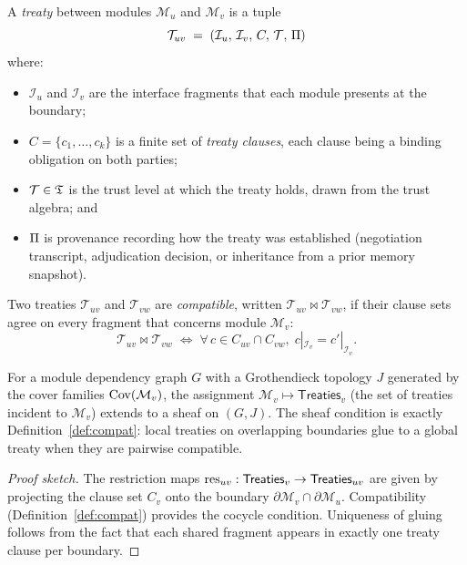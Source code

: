 \documentclass[11pt]{article}
\newcommand{\Trt}{\mathcal{T}}             %
\newcommand{\TrtSet}{\mathsf{Treaties}}    %
\newcommand{\Mod}{\mathcal{M}}            %
\newcommand{\Iface}{\mathcal{I}}          %
\newcommand{\Bdry}{\partial}             %
\newcommand{\Compat}{\bowtie}             %
\begin{document}
\begin{definition}[Treaty]\label{def:treaty}
A \emph{treaty} between modules $\Mod_u$ and $\Mod_v$ is a tuple
\[
  \Trt_{uv} \;=\; (\Iface_u,\, \Iface_v,\, C,\, \trust,\, \prov)
\]
where:
\begin{itemize}[leftmargin=*,noitemsep]
  \item $\Iface_u$ and $\Iface_v$ are the interface fragments that
    each module presents at the boundary;
  \item $C = \{c_1, \ldots, c_k\}$ is a finite set of
    \emph{treaty clauses}, each clause being a binding obligation
    on both parties;
  \item $\mathcal{T} \in \mathfrak{T}$ is the trust level at which the treaty
    holds, drawn from the \JuGeo{} trust algebra; and
  \item $\Pi$ is provenance recording how the treaty was
    established (negotiation transcript, adjudication decision, or
    inheritance from a prior memory snapshot).
\end{itemize}
\end{definition}

\begin{definition}\label{def:compat}
Two treaties $\Trt_{uv}$ and $\Trt_{vw}$ are \emph{compatible},
written $\Trt_{uv} \Compat \Trt_{vw}$, if their clause sets agree on
every fragment that concerns module $\Mod_v$:
\[
  \Trt_{uv} \Compat \Trt_{vw}
  \;\iff\;
  \forall\, c \in C_{uv} \cap C_{vw},\;
  c|_{\Iface_v} = c'|_{\Iface_v}.
\]
\end{definition}

\begin{proposition}\label{prop:sheaf}
For a module dependency graph $G$ with a Grothendieck topology $J$
generated by the cover families $\Cov(\Mod_v)$,
the assignment $\Mod_v \mapsto \TrtSet_v$ (the set of treaties
incident to $\Mod_v$) extends to a sheaf on $(G, J)$.
The sheaf condition is exactly Definition~\ref{def:compat}: local
treaties on overlapping boundaries glue to a global treaty when they
are pairwise compatible.
\end{proposition}

\begin{proof}[Proof sketch]
The restriction maps $\res_{uv} : \TrtSet_v \to \TrtSet_{uv}$ are
given by projecting the clause set $C_v$ onto the boundary $\Bdry\Mod_v
\cap \Bdry\Mod_u$.  Compatibility (Definition~\ref{def:compat})
provides the cocycle condition.  Uniqueness of gluing follows from the
fact that each shared fragment appears in exactly one treaty clause per
boundary.
\end{proof}
\end{document}
